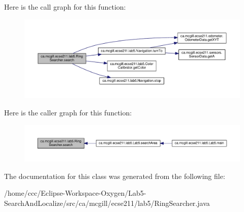 Here is the call graph for this function\+:
\nopagebreak
\begin{figure}[H]
\begin{center}
\leavevmode
\includegraphics[width=350pt]{classca_1_1mcgill_1_1ecse211_1_1lab5_1_1_ring_searcher_a88a4c77f3c76d74edc8bfd0229f0902f_cgraph}
\end{center}
\end{figure}
Here is the caller graph for this function\+:
\nopagebreak
\begin{figure}[H]
\begin{center}
\leavevmode
\includegraphics[width=350pt]{classca_1_1mcgill_1_1ecse211_1_1lab5_1_1_ring_searcher_a88a4c77f3c76d74edc8bfd0229f0902f_icgraph}
\end{center}
\end{figure}


The documentation for this class was generated from the following file\+:\begin{DoxyCompactItemize}
\item 
/home/ccc/\+Eclipse-\/\+Workspace-\/\+Oxygen/\+Lab5-\/\+Search\+And\+Localize/src/ca/mcgill/ecse211/lab5/Ring\+Searcher.\+java\end{DoxyCompactItemize}
